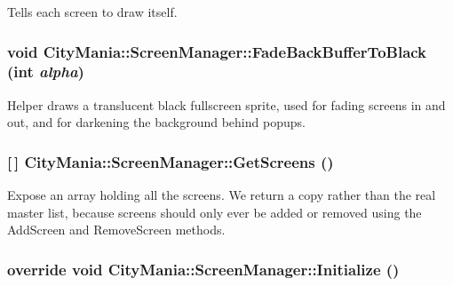 Tells each screen to draw itself. \hypertarget{classCityMania_1_1ScreenManager_a38cabc3f8bad9e348abf1a37353640e0}{
\subsubsection[{FadeBackBufferToBlack}]{\setlength{\rightskip}{0pt plus 5cm}void CityMania::ScreenManager::FadeBackBufferToBlack (int {\em alpha})}}
\label{classCityMania_1_1ScreenManager_a38cabc3f8bad9e348abf1a37353640e0}


Helper draws a translucent black fullscreen sprite, used for fading screens in and out, and for darkening the background behind popups. \hypertarget{classCityMania_1_1ScreenManager_adcd1bf4bd14623016140047118beb92b}{
\subsubsection[{GetScreens}]{ \mbox{[}$\,$\mbox{]} CityMania::ScreenManager::GetScreens ()}}
\label{classCityMania_1_1ScreenManager_adcd1bf4bd14623016140047118beb92b}


Expose an array holding all the screens. We return a copy rather than the real master list, because screens should only ever be added or removed using the AddScreen and RemoveScreen methods. \hypertarget{classCityMania_1_1ScreenManager_a3b8674d0e581b9bce7ebfa07431f0ad0}{
\subsubsection[{Initialize}]{\setlength{\rightskip}{0pt plus 5cm}override void CityMania::ScreenManager::Initialize ()}}
\label{classCityMania_1_1ScreenManager_a3b8674d0e581b9bce7ebfa07431f0ad0}


